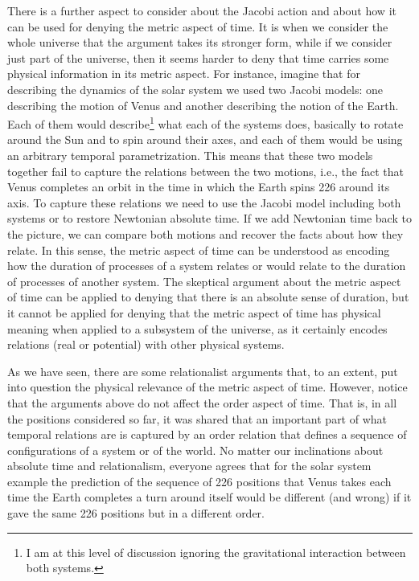 \documentclass[12 pt]{article}
\begin{document}
There is a further aspect to consider about the Jacobi action and about how it can be used for denying the metric aspect of time. It is when we consider the whole universe that the argument takes its stronger form, while if we consider just part of the universe, then it seems harder to deny that time carries some physical information in its metric aspect. For instance, imagine that for describing the dynamics of the solar system we used two Jacobi models: one describing the motion of Venus and another describing the notion of the Earth. Each of them would describe\footnote{I am at this level of discussion ignoring the gravitational interaction between both systems.} what each of the systems does, basically to rotate around the Sun and to spin around their axes, and each of them would be using an arbitrary temporal parametrization. This means that these two models together fail to capture the relations between the two motions, i.e., the fact that Venus completes an orbit in the time in which the Earth spins 226 around its axis. To capture these relations we need to use the Jacobi model including both systems or to restore Newtonian absolute time. If we add Newtonian time back to the picture, we can compare both motions and recover the facts about how they relate. In this sense, the metric aspect of time can be understood as encoding how the duration of processes of a system relates or would relate to the duration of processes of another system. The skeptical argument about the metric aspect of time can be applied to denying that there is an absolute sense of duration, but it cannot be applied for denying that the metric aspect of time has physical meaning when applied to a subsystem of the universe, as it certainly encodes relations (real or potential) with other physical systems.

As we have seen, there are some relationalist arguments that, to an extent, put into question the physical relevance of the metric aspect of time. However, notice that the arguments above do not affect the order aspect of time. That is, in all the positions considered so far, it was shared that an important part of what temporal relations are is captured by an order relation that defines a sequence of configurations of a system or of the world. No matter our inclinations about absolute time and relationalism, everyone agrees that for the solar system example the prediction of the sequence of 226 positions that Venus takes each time the Earth completes a turn around itself would be different (and wrong) if it gave the same 226 positions but in a different order.
\end{document}

